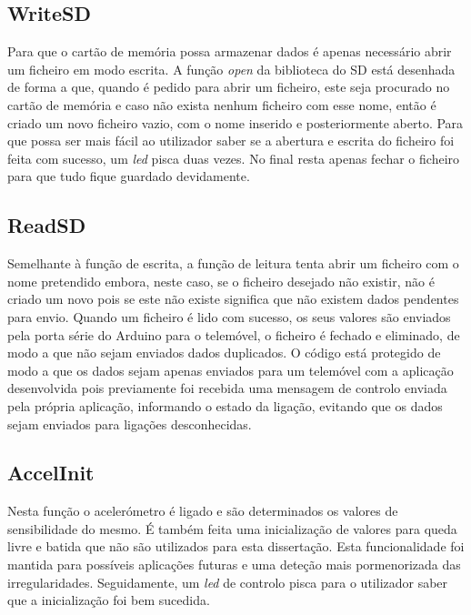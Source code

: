 \subsection{WriteSD}
\label{sub:writesd}

Para que o cartão de memória possa armazenar dados é apenas necessário abrir um ficheiro em modo escrita.
A função \emph{open} da biblioteca do SD está desenhada de forma a que, quando é pedido para abrir um ficheiro, este seja procurado no cartão de memória e caso não exista nenhum ficheiro com esse nome, então é criado um novo ficheiro vazio, com o nome inserido e posteriormente aberto.
Para que possa ser mais fácil ao utilizador saber se a abertura e escrita do ficheiro foi feita com sucesso, um \emph{led} pisca duas vezes.
No final resta apenas fechar o ficheiro para que tudo fique guardado devidamente.

\subsection{ReadSD}
\label{sub:readsd}

Semelhante à função de escrita, a função de leitura tenta abrir um ficheiro com o nome pretendido embora, neste caso, se o ficheiro desejado não existir, não é criado um novo pois se este não existe significa que não existem dados pendentes para envio.
Quando um ficheiro é lido com sucesso, os seus valores são enviados pela porta série do Arduino para o telemóvel, o ficheiro é fechado e eliminado, de modo a que não sejam enviados dados duplicados.
O código está protegido de modo a que os dados sejam apenas enviados para um telemóvel com a aplicação desenvolvida pois previamente foi recebida uma mensagem de controlo enviada pela própria aplicação, informando o estado da ligação, evitando que os dados sejam enviados para ligações desconhecidas.

\subsection{AccelInit}
\label{sub:accelInit}

Nesta função o acelerómetro é ligado e são determinados os valores de sensibilidade do mesmo.
É também feita uma inicialização de valores para queda livre e batida que não são utilizados para esta dissertação.
Esta funcionalidade foi mantida para possíveis aplicações futuras e uma deteção mais pormenorizada das irregularidades.
Seguidamente, um \emph{led} de controlo pisca para o utilizador saber que a inicialização foi bem sucedida.

